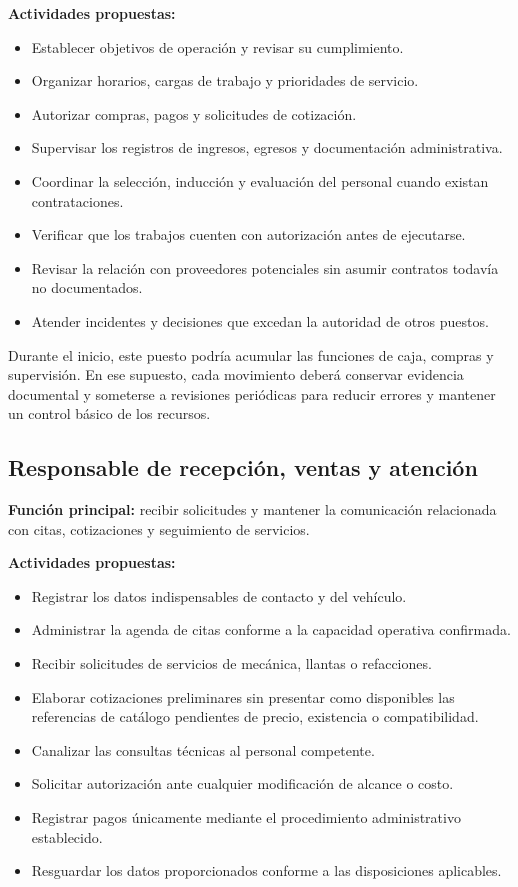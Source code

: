 \documentclass[12pt,letterpaper,oneside]{article}
\begin{document}
\textbf{Actividades propuestas:}
\begin{itemize}
    \item Establecer objetivos de operación y revisar su cumplimiento.
    \item Organizar horarios, cargas de trabajo y prioridades de servicio.
    \item Autorizar compras, pagos y solicitudes de cotización.
    \item Supervisar los registros de ingresos, egresos y documentación administrativa.
    \item Coordinar la selección, inducción y evaluación del personal cuando existan contrataciones.
    \item Verificar que los trabajos cuenten con autorización antes de ejecutarse.
    \item Revisar la relación con proveedores potenciales sin asumir contratos todavía no documentados.
    \item Atender incidentes y decisiones que excedan la autoridad de otros puestos.
\end{itemize}

Durante el inicio, este puesto podría acumular las funciones de caja, compras y supervisión. En ese supuesto, cada movimiento deberá conservar evidencia documental y someterse a revisiones periódicas para reducir errores y mantener un control básico de los recursos.

\subsection{Responsable de recepción, ventas y atención}

\textbf{Función principal:} recibir solicitudes y mantener la comunicación relacionada con citas, cotizaciones y seguimiento de servicios.

\textbf{Actividades propuestas:}
\begin{itemize}
    \item Registrar los datos indispensables de contacto y del vehículo.
    \item Administrar la agenda de citas conforme a la capacidad operativa confirmada.
    \item Recibir solicitudes de servicios de mecánica, llantas o refacciones.
    \item Elaborar cotizaciones preliminares sin presentar como disponibles las referencias de catálogo pendientes de precio, existencia o compatibilidad.
    \item Canalizar las consultas técnicas al personal competente.
    \item Solicitar autorización ante cualquier modificación de alcance o costo.
    \item Registrar pagos únicamente mediante el procedimiento administrativo establecido.
    \item Resguardar los datos proporcionados conforme a las disposiciones aplicables.
\end{itemize}
\end{document}
